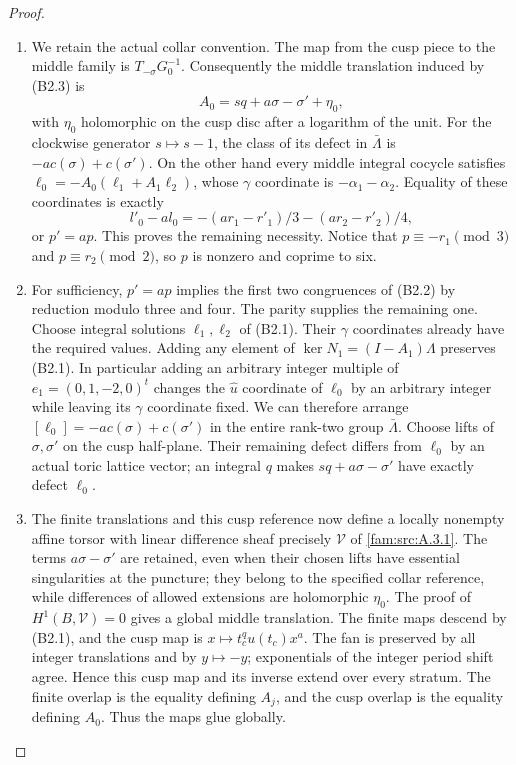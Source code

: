 \begin{proof}
\begin{enumerate}[label=\arabic*.,leftmargin=*]
\item We retain the actual collar convention. The map from the cusp piece to the middle family is $T_{-\sigma}G_0^{-1}$. Consequently the middle translation induced by (B2.3) is
\[
 A_0=sq+a\sigma-\sigma'+\eta_0,
\]
with $\eta_0$ holomorphic on the cusp disc after a logarithm of the unit. For the clockwise generator $s\mapsto s-1$, the class of its defect in $\bar\Lambda$ is $-a c(\sigma)+c(\sigma')$. On the other hand every middle integral cocycle satisfies
$\ell_0=-A_0(\ell_1+A_1\ell_2)$, whose $\gamma$ coordinate is $-\alpha_1-\alpha_2$. Equality of these coordinates is exactly
\[
 l'_0-a l_0=-(ar_1-r'_1)/3-(ar_2-r'_2)/4,
\]
or $p'=ap$. This proves the remaining necessity. Notice that $p\equiv-r_1\pmod3$ and $p\equiv r_2\pmod2$, so $p$ is nonzero and coprime to six.

\item For sufficiency, $p'=ap$ implies the first two congruences of (B2.2) by reduction modulo three and four. The parity supplies the remaining one. Choose integral solutions $\ell_1,\ell_2$ of (B2.1). Their $\gamma$ coordinates already have the required values. Adding any element of $\ker N_1=(I-A_1)\Lambda$ preserves (B2.1). In particular adding an arbitrary integer multiple of $e_1=(0,1,-2,0)^t$ changes the $\widehat u$ coordinate of $\ell_0$ by an arbitrary integer while leaving its $\gamma$ coordinate fixed. We can therefore arrange
$[\ell_0]=-a c(\sigma)+c(\sigma')$ in the entire rank-two group $\bar\Lambda$. Choose lifts of $\sigma,\sigma'$ on the cusp half-plane. Their remaining defect differs from $\ell_0$ by an actual toric lattice vector; an integral $q$ makes $sq+a\sigma-\sigma'$ have exactly defect $\ell_0$.

\item The finite translations and this cusp reference now define a locally nonempty affine torsor with linear difference sheaf precisely $\mathcal V$ of \ref{fam:src:A.3.1}. The terms $a\sigma-\sigma'$ are retained, even when their chosen lifts have essential singularities at the puncture; they belong to the specified collar reference, while differences of allowed extensions are holomorphic $\eta_0$. The proof of $H^1(B,\mathcal V)=0$ gives a global middle translation. The finite maps descend by (B2.1), and the cusp map is $x\mapsto t_c^qu(t_c)x^a$. The fan is preserved by all integer translations and by $y\mapsto-y$; exponentials of the integer period shift agree. Hence this cusp map and its inverse extend over every stratum. The finite overlap is the equality defining $A_j$, and the cusp overlap is the equality defining $A_0$. Thus the maps glue globally.


\end{enumerate}
\end{proof}
